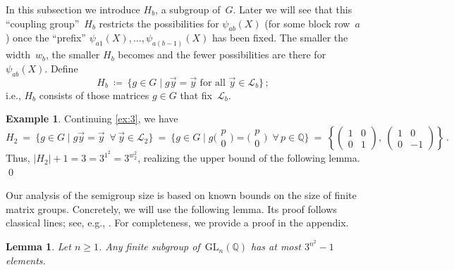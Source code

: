 \documentclass{lmcs}
\newtheorem{lemma}[thm]{Lemma}
\theoremstyle{definition}
\newtheorem{example}[thm]{Example}
\newcommand{\GL}{\mathrm{GL}}
\newcommand{\cL}{\mathcal{L}}
\newcommand{\Q}{\mathbb{Q}}
\begin{document}
In this subsection we introduce $H_b$, a subgroup of~$G$.
Later we will see that this ``coupling group''~$H_b$ restricts the possibilities for $\psi_{a b}(X)$ (for some block row~$a$) once the ``prefix'' $\psi_{a 1}(X), \ldots, \psi_{a (b-1)}(X)$ has been fixed.
The smaller the width~$w_b$, the smaller $H_b$ becomes and the fewer possibilities are there for~$\psi_{a b}(X)$.
Define
\[
H_b \ \coloneqq \ \{g \in G \mid g \vec{y} = \vec{y} \text{ for all } \vec{y} \in \cL_b\}\,;
\]
i.e., $H_b$ consists of those matrices $g \in G$ that fix~$\cL_b$.

\begin{example} \label{ex:4}
Continuing \cref{ex:3}, we have
\[
H_2 
\ = \ \{g \in G \mid g \vec{y} = \vec{y} \ \; \forall\,\vec{y} \in \cL_2\}
\ = \ \{g \in G \mid g \big(\begin{smallmatrix}p \\ 0 \end{smallmatrix}\big) = \big(\begin{smallmatrix}p \\ 0 \end{smallmatrix}\big) \ \; \forall\, p \in \Q\}
\ = \ \left\{\left(\begin{smallmatrix}1&0\\0&1\end{smallmatrix}\right),\ \left(\begin{smallmatrix}1&0\\0&-1\end{smallmatrix}\right)\right\}\,.
\]
Thus, $|H_2|+1 = 3 = 3^{1^2} = 3^{w_2^2}$, realizing the upper bound of the following lemma.
\qed
\end{example}

Our analysis of the semigroup size is based on known bounds on the size of finite matrix groups.
Concretely, we will use the following lemma.
Its proof follows classical lines; see, e.g., \cite{KuzmanovichPavlichenkov02}.
For completeness, we provide a proof in the appendix.



\begin{lemma}\label{lem:bound-on-group-size}
Let $n \ge 1$.
Any finite subgroup of~$\GL_n(\Q)$ has at most $3^{n^2}-1$ elements.
\end{lemma}
\end{document}
